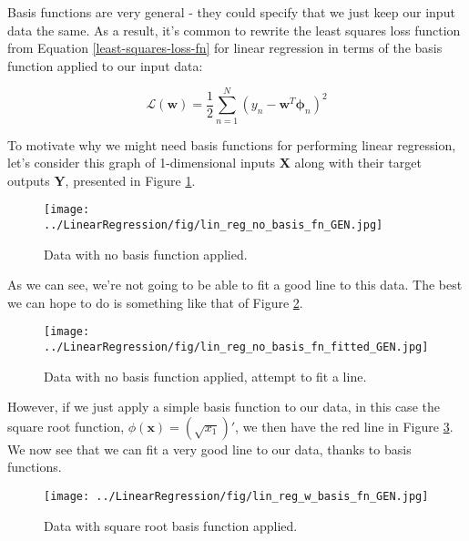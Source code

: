 
Basis functions are very general - they could specify that we just keep our input data the same. As a result, it's common to rewrite the least squares loss function from Equation \ref{least-squares-loss-fn} for linear regression in terms of the basis function applied to our input data:

\begin{equation} \label{least-squares-loss-fn-w-basis}
    \mathcal{L}(\textbf{w}) = \frac{1}{2} \sum_{n=1}^{N} (y_{n} - \textbf{w}^{T}\boldsymbol{\phi}_{n})^2
\end{equation}

To motivate why we might need basis functions for performing linear regression, let's consider this graph of 1-dimensional inputs \textbf{X} along with their target outputs \textbf{Y}, presented in Figure \ref{fig:lin-reg-no-basis-fn}.

\begin{figure}
    \centering
    \texttt{[image: ../LinearRegression/fig/lin\_reg\_no\_basis\_fn\_GEN.jpg]}
    \caption{Data with no basis function applied.}
    \label{fig:lin-reg-no-basis-fn}
\end{figure}

As we can see, we're not going to be able to fit a good line to this data. The best we can hope to do is something like that of Figure \ref{fig:lin-reg-no-basis-fn-fitted}.

\begin{figure}
    \centering
    \texttt{[image: ../LinearRegression/fig/lin\_reg\_no\_basis\_fn\_fitted\_GEN.jpg]}
    \caption{Data with no basis function applied, attempt to fit a line.}
    \label{fig:lin-reg-no-basis-fn-fitted}
\end{figure}

However, if we just apply a simple basis function to our data, in this case the square root function, $\phi(\textbf{x}) = (\sqrt{x_{1}})'$, we then have the red line in Figure \ref{fig:lin-reg-w-basis-fn-fitted}. We now see that we can fit a very good line to our data, thanks to basis functions.

\begin{figure}
    \centering
    \texttt{[image: ../LinearRegression/fig/lin\_reg\_w\_basis\_fn\_GEN.jpg]}
    \caption{Data with square root basis function applied.}
    \label{fig:lin-reg-w-basis-fn-fitted}
\end{figure}

